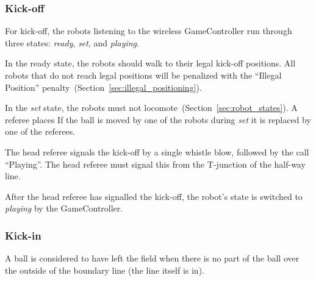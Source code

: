 \subsubsection{Kick-off}
\label{sec:kick-off}
For kick-off, the robots listening to the wireless GameController run through three states: \emph{ready}, \emph{set}, and \emph{playing}. 

In the ready state, the robots should walk to their legal kick-off positions.
All robots that do not reach legal positions will be penalized with the ``Illegal Position'' penalty~(\cf Section~\ref{sec:illegal_positioning}).

In the \emph{set} state, the robots must not locomote~(\cf Section~\ref{sec:robot_states}). A referee places 
If the ball is moved by one of the robots during \emph{set} it is replaced by one of the referees.


The head referee signals the kick-off by a single whistle blow, followed by the call ``Playing''. The head referee must signal this from the T-junction of the half-way line.

After the head referee has signalled the kick-off, the robot's state is switched to \emph{playing} by the GameController.

\subsubsection{Kick-in}
\label{sec:kick_in}

A ball is considered to have left the field when there is no part of the ball over the outside of the boundary line (\ie the line itself is in). \\
 \\

